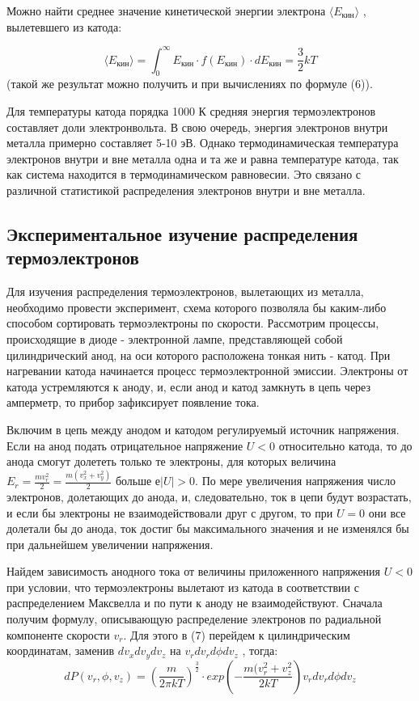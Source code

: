 \par 
Можно найти среднее значение кинетической энергии электрона $\langle E_{\text{кин}} \rangle$ ,
вылетевшего из катода:

\[\langle E_{\text{кин}} \rangle = \int_{0}^{\infty}E_{\text{кин}}\cdot f(E_{\text{кин}}) \cdot dE_{\text{кин}} = \frac{3}{2}kT\]
(такой же результат можно получить и при вычислениях по формуле (6)).
\par 
Для температуры катода порядка 1000 К средняя энергия термоэлектронов
составляет доли электронвольта. В свою очередь, энергия электронов внутри
металла примерно составляет 5-10 эВ. Однако термодинамическая температура
электронов внутри и вне металла одна и та же и равна температуре катода, так как
система находится в термодинамическом равновесии. Это связано с различной
статистикой распределения электронов внутри и вне металла.

\subsection{Экспериментальное изучение распределения термоэлектронов}

\par
Для изучения распределения термоэлектронов, вылетающих из металла,
необходимо провести эксперимент, схема которого позволяла бы каким-либо
способом сортировать термоэлектроны по скорости. Рассмотрим процессы,
происходящие в диоде - электронной лампе, представляющей собой
цилиндрический анод, на оси которого расположена тонкая нить - катод. При
нагревании катода начинается процесс термоэлектронной эмиссии. Электроны от
катода устремляются к аноду, и, если анод и катод замкнуть в цепь через
амперметр, то прибор зафиксирует появление тока.
\par Включим в цепь между анодом и катодом регулируемый источник
напряжения. Если на анод подать отрицательное напряжение $U<0$ относительно
катода, то до анода смогут долететь только те электроны, для которых величина
$E_r = \frac{mv_{r}^{2}}{2} = \frac{m(v_{x}^{2} + v_{y}^{2})}{2}$ больше $е|U|>0$. По мере увеличения напряжения число
электронов, долетающих до анода, и, следовательно, ток в цепи будут возрастать,
и если бы электроны не взаимодействовали друг с другом, то при $U=0$ они все
долетали бы до анода, ток достиг бы максимального значения и не изменялся бы
при дальнейшем увеличении напряжения.
\par
Найдем зависимость анодного тока от величины приложенного
напряжения $U<0$ при условии, что термоэлектроны вылетают из катода в
соответствии с распределением Максвелла и по пути к аноду не
взаимодействуют. Сначала получим формулу, описывающую распределение
электронов по радиальной компоненте скорости $v_r$. Для этого в (7) перейдем к
цилиндрическим координатам, заменив $dv_x dv_y dv_z$ на $v_r dv_r d\phi dv_z$ , тогда:
\[dP(v_r, \phi, v_z) = (\frac{m}{2\pi kT})^{\frac{3}{2}} \cdot exp(-\frac{m(v_{r}^{2} + v_{z}^{2}}{2kT}) v_r dv_r d \phi dv_z \]

